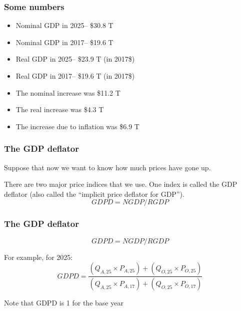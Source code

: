 \documentclass[aspectratio=169]{beamer}
\newenvironment{wideitemize}{\itemize\addtolength{\itemsep}{10pt}}{\enditemize}
\newcommand{\lastyear}{2025}
\newcommand{\baseyear}{2017}
\newcommand{\baseyearshort}{17}
\newcommand{\lastyearshort}{25}
\begin{document}
\begin{frame}
\frametitle{Some numbers}
\begin{itemize}
\item Nominal GDP in \lastyear -- \$30.8 T
\item Nominal GDP in \baseyear -- \$19.6 T

\item Real GDP in \lastyear -- \$23.9 T (in \baseyear \$)
\item Real GDP in \baseyear -- \$19.6 T (in \baseyear \$)
\vspace{11pt}
\item The nominal increase was \$11.2 T
\item The real increase was \$4.3 T
\item The increase due to inflation was \$6.9 T
\end{itemize}

\end{frame}


\begin{frame}
\frametitle{The GDP deflator}

\begin{wideitemize}
\item Suppose that now we want to know how much prices have gone up.
\item There are two major price indices that we use.  One index is called the GDP deflator (also called the ``implicit price deflator for GDP'').
\end{wideitemize}
\begin{equation*}
GDPD = NGDP / RGDP
\end{equation*}
\end{frame}


\begin{frame}
\frametitle{The GDP deflator}

\begin{equation*}
GDPD = NGDP / RGDP
\end{equation*}

\begin{wideitemize}
\item For example, for \lastyear:
\begin{equation*}
GDPD = \frac{(Q_{A,\lastyearshort} \times P_{A,\lastyearshort})  +  (Q_{O,\lastyearshort} \times P_{O,\lastyearshort})}
{(Q_{A,\lastyearshort} \times P_{A,\baseyearshort})  +  (Q_{O,\lastyearshort} \times P_{O,\baseyearshort})}
\end{equation*}

\item Note that GDPD is 1 for the base year
\end{wideitemize}
\end{frame}
\end{document}
